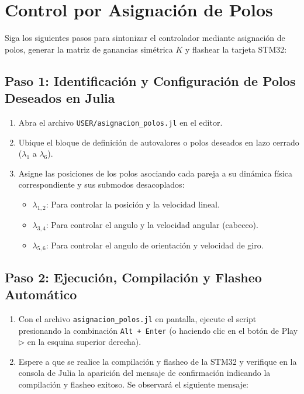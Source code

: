 \section{Control por Asignaci\'on de Polos}

Siga los siguientes pasos para sintonizar el controlador mediante asignaci\'on de polos, generar la matriz de ganancias sim\'etrica $K$ y flashear la tarjeta STM32:

\subsection*{Paso 1: Identificaci\'on y Configuraci\'on de Polos Deseados en Julia}
\begin{enumerate}
    \item Abra el archivo \texttt{USER/asignacion\_polos.jl} en el editor.
    \item Ubique el bloque de definici\'on de autovalores o polos deseados en lazo cerrado ($\lambda_1$ a $\lambda_6$).
    \item Asigne las posiciones de los polos asociando cada pareja a su din\'amica f\'isica correspondiente y sus submodos desacoplados:

    \begin{itemize}
        \item $\lambda_{1,2}$: Para controlar la posición y la velocidad lineal.

        \item $\lambda_{3,4}$: Para controlar el angulo y la velocidad angular (cabeceo).
        
        \item $\lambda_{5,6}$: Para controlar el angulo de orientación y velocidad de giro. 
    \end{itemize}
\end{enumerate}

\subsection*{Paso 2: Ejecución, Compilación y Flasheo Autom\'atico}
\begin{enumerate}
    \item Con el archivo \texttt{asignacion\_polos.jl} en pantalla, ejecute el script presionando la combinaci\'on \texttt{Alt + Enter} (o haciendo clic en el bot\'on de Play $\triangleright$ en la esquina superior derecha).
  
    \item Espere a que se realice la compilaci\'on y flasheo de la STM32 y verifique en la consola de Julia la aparici\'on del mensaje de confirmaci\'on indicando la compilaci\'on y flasheo exitoso. Se observar\'a el siguiente mensaje:
\end{enumerate}

